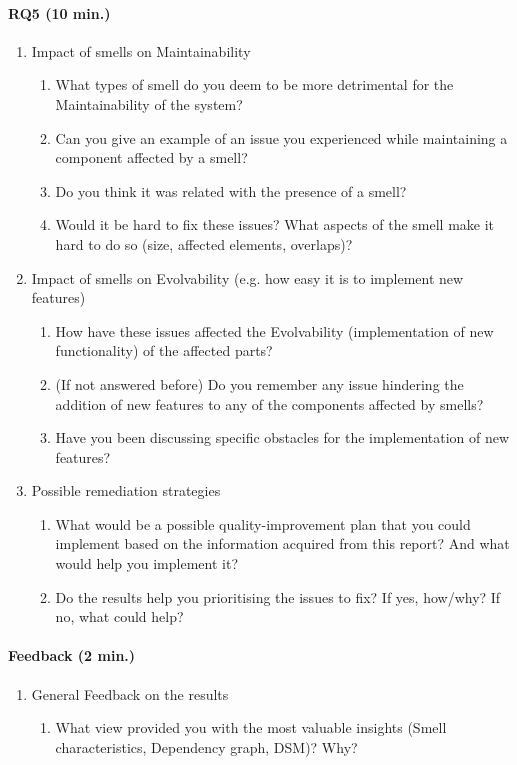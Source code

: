 \paragraph{RQ5 (10 min.)}
\begin{enumerate}[resume]
    \item Impact of smells on Maintainability
    \begin{enumerate}
        \item What types of smell do you deem to be more detrimental for the Maintainability of the system?
        \item Can you give an example of an issue you experienced while maintaining a component affected by a smell?
        \item Do you think it was related with the presence of a smell?
        \item Would it be hard to fix these issues? What aspects of the smell make it hard to do so (size, affected elements, overlaps)?
    \end{enumerate}
    \item Impact of smells on Evolvability (e.g. how easy it is to implement new features)
    \begin{enumerate}
        \item How have these issues affected the Evolvability (implementation of new functionality) of the affected parts?
        \item (If not answered before) Do you remember any issue hindering the addition of new features to any of the components affected by smells?
        \item Have you been discussing specific obstacles for the implementation of new features?
    \end{enumerate}
    \item Possible remediation strategies
    \begin{enumerate}
        \item What would be a possible quality-improvement plan that you could implement based on the information acquired from this report? And what would help you implement it?
        \item Do the results help you prioritising the issues to fix? If yes, how/why? If no, what could help?
    \end{enumerate}
\end{enumerate}
\paragraph{Feedback (2 min.)}
\begin{enumerate}
    \item General Feedback on the results
    \begin{enumerate}
        \item What view provided you with the most valuable insights (Smell characteristics, Dependency graph, DSM)? Why?
    \end{enumerate}
\end{enumerate}
    